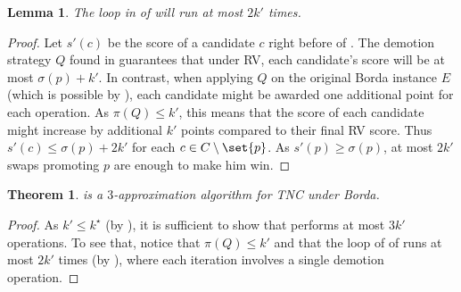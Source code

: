 \documentclass[letterpaper]{article} %
\newtheorem{theorem}{Theorem}
\newtheorem{lemma}{Lemma}
\newcommand{\SB}{\textsc{TNC}}
\begin{document}
\begin{lemma} \label{2t-loopLemma}
The loop in  of  will run at most $2k'$ times.
\end{lemma}
\begin{proof}
Let $s'(c)$ be the score of a candidate $c$ right before  of .
The demotion strategy $Q$  found in  guarantees that under RV, each candidate's score will be at most $\sigma(p)+k'$. In contrast, when applying $Q$ on the original Borda instance $E$ (which is possible by ), each candidate might be awarded one additional point for each operation. As $\pi(Q) \leq k'$, this means that the score of each candidate might increase by additional $k'$ points compared to their final RV score. Thus $s'(c) \leq \sigma(p) + 2k'$ for each $c \in C \setminus \set{p}$.
As $s'(p) \geq \sigma(p)$, at most $2k'$ swaps promoting $p$ are enough to make him win.
\end{proof}
\begin{theorem}
 is a $3$-approximation algorithm for \SB{} under Borda.
\end{theorem}
\begin{proof}
As $k' \leq k^\star$ (by ), it is sufficient to show that  performs at most $3k'$  operations. To see that, notice that $\pi(Q) \leq k'$ and that the loop of  of  runs   at most $2k'$ times (by ), where each iteration involves a single demotion operation.
\end{proof}
\end{document}
